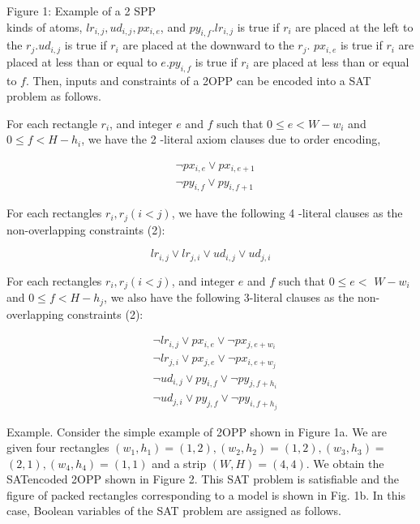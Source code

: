 \documentclass[10pt]{article}
\begin{document}
Figure 1: Example of a 2 SPP\\
kinds of atoms, $l r_{i, j}, u d_{i, j}, p x_{i, e}$, and $p y_{i, f} . l r_{i, j}$ is true if $r_{i}$ are placed at the left to the $r_{j} . u d_{i, j}$ is true if $r_{i}$ are placed at the downward to the $r_{j}$. $p x_{i, e}$ is true if $r_{i}$ are placed at less than or equal to $e . p y_{i, f}$ is true if $r_{i}$ are placed at less than or equal to $f$. Then, inputs and constraints of a 2OPP can be encoded into a SAT problem as follows.

For each rectangle $r_{i}$, and integer $e$ and $f$ such that $0 \leq e<W-w_{i}$ and $0 \leq f<H-h_{i}$, we have the 2 -literal axiom clauses due to order encoding,


\begin{align*}
& \neg p x_{i, e} \vee p x_{i, e+1}  \tag{3}\\
& \neg p y_{i, f} \vee p y_{i, f+1}
\end{align*}


For each rectangles $r_{i}, r_{j}(i<j)$, we have the following 4 -literal clauses as the non-overlapping constraints (2):


\begin{equation*}
l r_{i, j} \vee l r_{j, i} \vee u d_{i, j} \vee u d_{j, i} \tag{4}
\end{equation*}


For each rectangles $r_{i}, r_{j}(i<j)$, and integer $e$ and $f$ such that $0 \leq e<$ $W-w_{i}$ and $0 \leq f<H-h_{j}$, we also have the following 3-literal clauses as the non-overlapping constraints (2):


\begin{align*}
& \neg l r_{i, j} \vee p x_{i, e} \vee \neg p x_{j, e+w_{i}} \\
& \neg l r_{j, i} \vee p x_{j, e} \vee \neg p x_{i, e+w_{j}} \\
& \neg u d_{i, j} \vee p y_{i, f} \vee \neg p y_{j, f+h_{i}}  \tag{5}\\
& \neg u d_{j, i} \vee p y_{j, f} \vee \neg p y_{i, f+h_{j}}
\end{align*}


Example. Consider the simple example of 2OPP shown in Figure 1a. We are given four rectangles $\left(w_{1}, h_{1}\right)=(1,2),\left(w_{2}, h_{2}\right)=(1,2),\left(w_{3}, h_{3}\right)=$ $(2,1),\left(w_{4}, h_{4}\right)=(1,1)$ and a strip $(W, H)=(4,4)$. We obtain the SATencoded 2OPP shown in Figure 2. This SAT problem is satisfiable and the figure of packed rectangles corresponding to a model is shown in Fig. 1b. In this case, Boolean variables of the SAT problem are assigned as follows.
\end{document}

